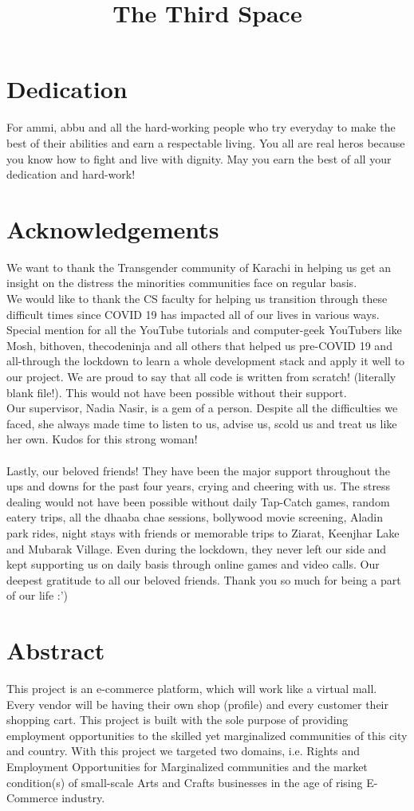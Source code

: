 \documentclass[12pt,twosided]{report}
\title{The Third Space}
\begin{document}

\chapter*{Dedication}
For ammi, abbu and all the hard-working people who try everyday to make the best of their abilities and earn a respectable living. You all are real heros because you know how to fight and live with dignity. May you earn the best of all your dedication and hard-work!

\chapter*{Acknowledgements}
We want to thank the Transgender community of Karachi in helping us get an insight on the distress the minorities communities face on regular basis.\\ We would like to thank the CS faculty for helping us transition through these difficult times since COVID 19 has impacted all of our lives in various ways.\\ Special mention for all the YouTube tutorials and computer-geek YouTubers like Mosh, bithoven, thecodeninja and all others that helped us pre-COVID 19 and all-through the lockdown to learn a whole development stack and apply it well to our project. We are proud to say that all code is written from scratch! (literally blank file!). This would not have been possible without their support.\\ Our supervisor, Nadia Nasir, is a gem of a person. Despite all the difficulties we faced, she always made time to listen to us, advise us, scold us and treat us like her own. Kudos for this strong woman!\\\\ Lastly, our beloved friends! They have been the major support throughout the ups and downs for the past four years, crying and cheering with us. The stress dealing would not have been possible without daily Tap-Catch games, random eatery trips, all the dhaaba chae sessions, bollywood movie screening, Aladin park rides, night stays with friends or memorable trips to Ziarat, Keenjhar Lake and Mubarak Village. Even during the lockdown, they never left our side and kept supporting us on daily basis through online games and video calls. Our deepest gratitude to all our beloved friends. Thank you so much for being a part of our life :')

\chapter*{Abstract}
This project is an e-commerce platform, which will work like a virtual mall. Every vendor will be having their own shop (profile) and every customer their shopping cart. This project is built with the sole purpose of providing employment opportunities to the skilled yet marginalized communities of this city and country. With this project we targeted two domains, i.e. Rights and Employment Opportunities for Marginalized communities and the market condition(s) of small-scale Arts and Crafts businesses in the age of rising E-Commerce industry.
\end{document}
